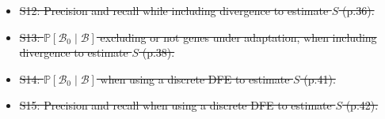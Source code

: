 \documentclass[10pt,letterpaper]{article}
\newcommand{\proba}{\mathbb{P}}
\newcommand{\SphyBen}{\mathcal{B}_0}
\newcommand{\given}{\mid}
\newcommand{\Spop}{S}
\newcommand{\SpopBen}{\mathcal{B}}
\providecommand{\DIFdeltex}[1]{{\protect\color{red}\sout{#1}}}                      %
\providecommand{\DIFdelend}{} %
\providecommand{\DIFdel}[1]{\texorpdfstring{\DIFdeltex{#1}}{}} %
\DeclareRobustCommand{\DIFdelend}{\DIFOaddend \let\includegraphics\DIFOincludegraphics} %
\begin{document}
\begin{itemize}
{}%
\item%
\DIFdel{S12: Precision and recall while including divergence to estimate $\Spop$ (p.36).
}%
\item%
\DIFdel{S13: $\proba[\SphyBen\given \SpopBen ]$ excluding or not genes under adaptation, when including divergence to estimate $\Spop$ (p.38).
}%
\item%
\DIFdel{S14: $\proba[\SphyBen\given \SpopBen ]$ when using a discrete DFE to estimate $\Spop$ (p.41).
}%
\item%
\DIFdel{S15: Precision and recall when using a discrete DFE to estimate $\Spop$ (p.42).
}
\end{itemize}%
\DIFdelend 
\end{document}
